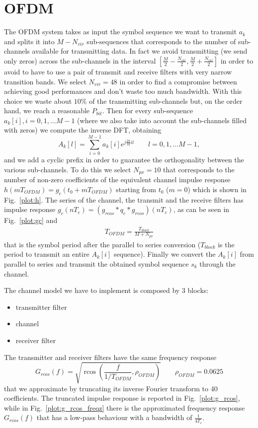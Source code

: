 \documentclass[a4paper,oneside]{article}
\DeclareMathOperator*{\rcos}{rcos}
\begin{document}
\section{OFDM}
\label{sec:ofdm}
The OFDM system takes as input the symbol sequence we want to transmit $a_k$ and splits it into $M-N_{vir}$ sub-sequences that corresponds to the number of sub-channels available for transmitting data. In fact we avoid transmitting (we send only zeros) across the sub-channels in the interval $[\frac{M}{2}-\frac{N_{vir}}{2},\frac{M}{2}+\frac{N_{vir}}{2}]$ in order to avoid to have to use a pair of transmit and receive filters with very narrow transition bands.
We select $N_{vir} = 48$ in order to find a compromise between achieving good performances and don't waste too much bandwidth. With this choice we waste about $ 10\% $ of the transmitting sub-channels but, on the order hand, we reach a reasonable $ P_{bit} $.
Then for every sub-sequence $a_k[i], i = 0,1,\dots M-1$ (where we also take into account the sub-channels filled with zeros) we compute the inverse DFT, obtaining
\begin{equation}
  A_k[l] = \sum_{i=0}^{M-1}a_k[i]e^{j\frac{2\pi}{M}il} \qquad l=0,1,\dots M-1 ,
\end{equation}
and we add a cyclic prefix in order to guarantee the orthogonality between the various sub-channels. To do this we select $N_{px} = 10$ that corresponds to the number of  non-zero coefficients of the equivalent channel impulse response $h(mT_{OFDM}) = g_c(t_0+ mT_{OFDM})$ starting from $t_0$ ($m = 0$) which is shown in Fig.~\ref{plot:h}. The series of the channel, the transmit and the receive filters has impulse response $g_c(nT_c) = \left(g_{rcos}*q_c*g_{rcos}\right)(nT_c)$, as can be seen in Fig.~\ref{plot:gc} and 
\begin{align*}
T_{OFDM} = \frac{T_{block}}{M+N_{px}}
\end{align*} 
that is the symbol period after the parallel to series conversion ($T_{block}$ is the period to transmit an entire $A_k[i]$ sequence).
Finally we convert the $A_k[i]$ from parallel to series and transmit the obtained symbol sequence $s_k$ through the channel.

The channel model we have to implement is composed by 3 blocks:
\begin{itemize}
\item transmitter filter
\item channel
\item receiver filter
\end{itemize} 
The transmitter and receiver filters have the same frequency response
\begin{equation}
  G_{rcos}(f) = \sqrt{\rcos\left(\frac{f}{1/T_{OFDM}}, \rho_{OFDM}\right)} \qquad \rho_{OFDM} = 0.0625
\end{equation}
that we approximate by truncating its inverse Fourier transform to 40
coefficients.
The truncated impulse response is reported in Fig.~\ref{plot:g_rcos}, while in Fig.~\ref{plot:g_rcos_freqz} there is the approximated frequency response $G_{rcos}(f)$ that has a low-pass behaviour with a bandwidth of $\frac{1}{4T_c}$.
\end{document}
